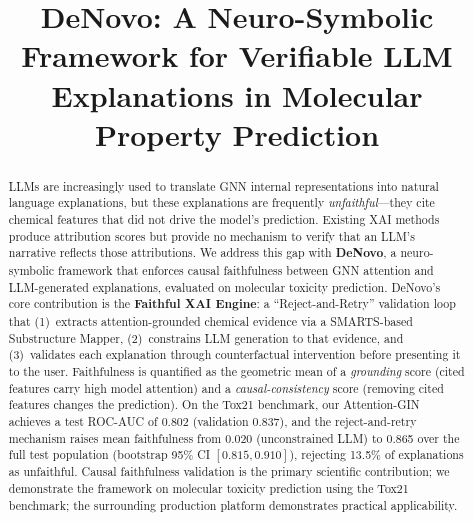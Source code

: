 \documentclass[conference]{IEEEtran}
\newcommand{\Fconstrained}{0.865}   %
\newcommand{\Funconstrained}{0.020}  %
\newcommand{\RejRate}{13.5\%}            %
\begin{document}
\title{DeNovo: A Neuro-Symbolic Framework for Verifiable LLM Explanations in Molecular Property Prediction}

\author{
\and
{}
}

\maketitle

\begin{abstract}
LLMs are increasingly used to translate GNN internal representations into natural language explanations, but these explanations are frequently \emph{unfaithful}---they cite chemical features that did not drive the model's prediction. Existing XAI methods produce attribution scores but provide no mechanism to verify that an LLM's narrative reflects those attributions. We address this gap with \textbf{DeNovo}, a neuro-symbolic framework that enforces causal faithfulness between GNN attention and LLM-generated explanations, evaluated on molecular toxicity prediction. DeNovo's core contribution is the \textbf{Faithful XAI Engine}: a ``Reject-and-Retry'' validation loop that (1)~extracts attention-grounded chemical evidence via a SMARTS-based Substructure Mapper, (2)~constrains LLM generation to that evidence, and (3)~validates each explanation through counterfactual intervention before presenting it to the user. Faithfulness is quantified as the geometric mean of a \emph{grounding} score (cited features carry high model attention) and a \emph{causal-consistency} score (removing cited features changes the prediction). On the Tox21 benchmark, our Attention-GIN achieves a test ROC-AUC of 0.802 (validation 0.837), and the reject-and-retry mechanism raises mean faithfulness from \Funconstrained{} (unconstrained LLM) to \Fconstrained{} over the full test population (bootstrap 95\% CI $[0.815, 0.910]$), rejecting \RejRate{} of explanations as unfaithful. Causal faithfulness validation is the primary scientific contribution; we demonstrate the framework on molecular toxicity prediction using the Tox21 benchmark; the surrounding production platform demonstrates practical applicability.
\end{abstract}
\end{document}
